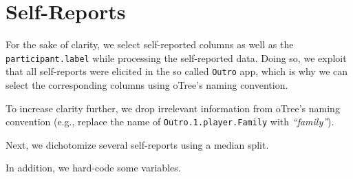 \documentclass[
  a4paper,
  DIV=11,
  numbers=noendperiod]{scrreprt}
\begin{document}
\hypertarget{self-reports}{%
\section{Self-Reports}\label{self-reports}}

For the sake of clarity, we select self-reported columns as well as the
\texttt{participant.label} while processing the self-reported data.
Doing so, we exploit that all self-reports were elicited in the so
called \texttt{Outro} app, which is why we can select the corresponding
columns using oTree's naming convention.

To increase clarity further, we drop irrelevant information from oTree's
naming convention (e.g., replace the name of
\texttt{Outro.1.player.Family} with \emph{``family''}).

Next, we dichotomize several self-reports using a median split.

In addition, we hard-code some variables.
\end{document}
